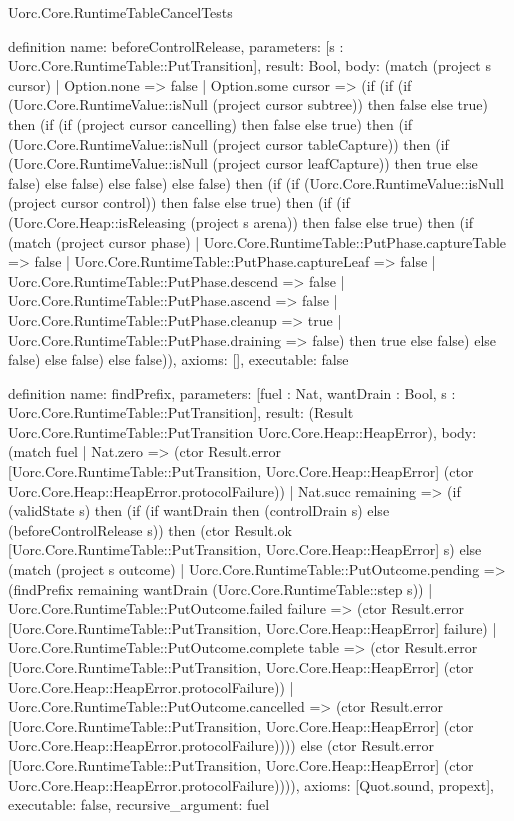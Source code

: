 \begin{lexlean}{Uorc.Core.RuntimeTableCancelTests}
\begin{semanticmodule}
definition{
  name: beforeControlRelease,
  parameters: [s : Uorc.Core.RuntimeTable::PutTransition],
  result: Bool,
  body: (match (project s cursor)
    | Option.none => false
    | Option.some cursor => (if (if (if (Uorc.Core.RuntimeValue::isNull (project cursor subtree)) then false else true) then (if (if (project cursor cancelling) then false else true) then (if (Uorc.Core.RuntimeValue::isNull (project cursor tableCapture)) then (if (Uorc.Core.RuntimeValue::isNull (project cursor leafCapture)) then true else false) else false) else false) else false) then (if (if (Uorc.Core.RuntimeValue::isNull (project cursor control)) then false else true) then (if (if (Uorc.Core.Heap::isReleasing (project s arena)) then false else true) then (if (match (project cursor phase)
      | Uorc.Core.RuntimeTable::PutPhase.captureTable => false
      | Uorc.Core.RuntimeTable::PutPhase.captureLeaf => false
      | Uorc.Core.RuntimeTable::PutPhase.descend => false
      | Uorc.Core.RuntimeTable::PutPhase.ascend => false
      | Uorc.Core.RuntimeTable::PutPhase.cleanup => true
      | Uorc.Core.RuntimeTable::PutPhase.draining => false) then true else false) else false) else false) else false)),
  axioms: [],
  executable: false
}

definition{
  name: findPrefix,
  parameters: [fuel : Nat, wantDrain : Bool, s : Uorc.Core.RuntimeTable::PutTransition],
  result: (Result Uorc.Core.RuntimeTable::PutTransition Uorc.Core.Heap::HeapError),
  body: (match fuel
    | Nat.zero => (ctor Result.error [Uorc.Core.RuntimeTable::PutTransition, Uorc.Core.Heap::HeapError] (ctor Uorc.Core.Heap::HeapError.protocolFailure))
    | Nat.succ remaining => (if (validState s) then (if (if wantDrain then (controlDrain s) else (beforeControlRelease s)) then (ctor Result.ok [Uorc.Core.RuntimeTable::PutTransition, Uorc.Core.Heap::HeapError] s) else (match (project s outcome)
      | Uorc.Core.RuntimeTable::PutOutcome.pending => (findPrefix remaining wantDrain (Uorc.Core.RuntimeTable::step s))
      | Uorc.Core.RuntimeTable::PutOutcome.failed failure => (ctor Result.error [Uorc.Core.RuntimeTable::PutTransition, Uorc.Core.Heap::HeapError] failure)
      | Uorc.Core.RuntimeTable::PutOutcome.complete table => (ctor Result.error [Uorc.Core.RuntimeTable::PutTransition, Uorc.Core.Heap::HeapError] (ctor Uorc.Core.Heap::HeapError.protocolFailure))
      | Uorc.Core.RuntimeTable::PutOutcome.cancelled => (ctor Result.error [Uorc.Core.RuntimeTable::PutTransition, Uorc.Core.Heap::HeapError] (ctor Uorc.Core.Heap::HeapError.protocolFailure)))) else (ctor Result.error [Uorc.Core.RuntimeTable::PutTransition, Uorc.Core.Heap::HeapError] (ctor Uorc.Core.Heap::HeapError.protocolFailure)))),
  axioms: [Quot.sound, propext],
  executable: false,
  recursive_argument: fuel
}


\end{semanticmodule}
\end{lexlean}
